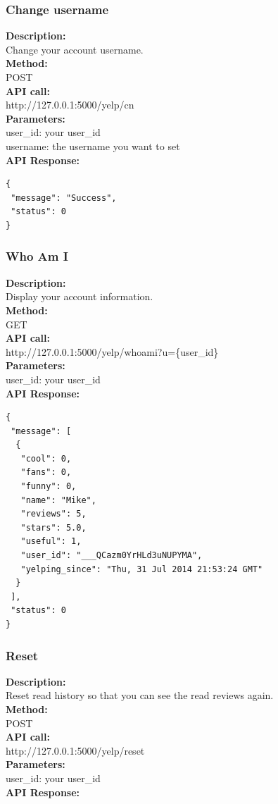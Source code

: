 \documentclass[12pt]{article}
\begin{document}
\subsubsection{Change username}
\textbf{Description:}\\
Change your account username.\\
\textbf{Method:}\\
POST\\
\textbf{API call:}\\ 
http://127.0.0.1:5000/yelp/cn\\
\textbf{Parameters:}\\
user\_id: your user\_id\\
username: the username you want to set\\
\textbf{API Response:}

\begin{singlespacing}
\begin{lstlisting}
{
 "message": "Success",
 "status": 0
}
\end{lstlisting}
\end{singlespacing}

\subsubsection{Who Am I}
\textbf{Description:}\\
Display your account information.\\
\textbf{Method:}\\
GET\\
\textbf{API call:}\\ 
http://127.0.0.1:5000/yelp/whoami?u=\{user\_id\}\\
\textbf{Parameters:}\\
user\_id: your user\_id\\
\textbf{API Response:}

\begin{singlespacing}
\begin{lstlisting}
{
 "message": [
  {
   "cool": 0,
   "fans": 0,
   "funny": 0,
   "name": "Mike",
   "reviews": 5,
   "stars": 5.0,
   "useful": 1,
   "user_id": "___QCazm0YrHLd3uNUPYMA",
   "yelping_since": "Thu, 31 Jul 2014 21:53:24 GMT"
  }
 ],
 "status": 0
}
\end{lstlisting}
\end{singlespacing}

\subsubsection{Reset}
\textbf{Description:}\\
Reset read history so that you can see the read reviews again.\\
\textbf{Method:}\\
POST\\
\textbf{API call:}\\ 
http://127.0.0.1:5000/yelp/reset\\
\textbf{Parameters:}\\
user\_id: your user\_id\\
\textbf{API Response:}
\end{document}
